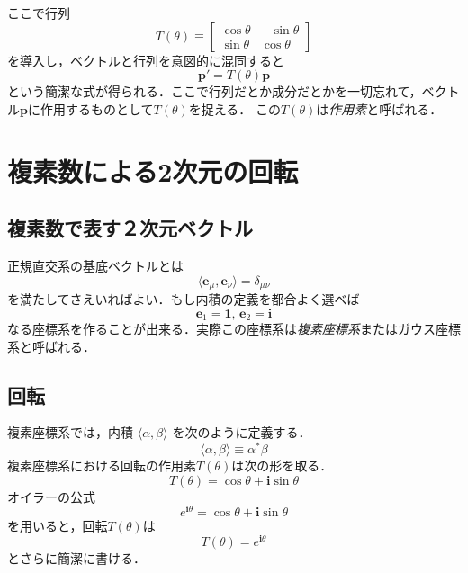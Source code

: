 \documentclass{jsbook}
\newcommand{\keyword}[1]{\emph{#1}}
\newcommand{\one}{\mathbf{1}}
\newcommand{\im}{\mathbf{i}}
\newcommand{\ee}{\mathit{e}}
\newcommand{\bvec}[1]{\boldsymbol{#1}}
\begin{document}
ここで行列
\begin{equation}
T(\theta)\equiv\begin{bmatrix}\cos\theta&-\sin\theta\\\sin\theta&\cos\theta\end{bmatrix}
\end{equation}
を導入し，ベクトルと行列を意図的に混同すると
\begin{equation}
\bvec{p}'=T(\theta)\bvec{p}
\end{equation}
という簡潔な式が得られる．ここで行列だとか成分だとかを一切忘れて，ベクトル$\bvec{p}$に作用するものとして$T(\theta)$を捉える．
この$T(\theta)$は\keyword{作用素}と呼ばれる．

\section{複素数による2次元の回転}

\subsection{複素数で表す２次元ベクトル}

正規直交系の基底ベクトルとは
\begin{equation}
\langle\bvec{e}_\mu,\bvec{e}_\nu\rangle=\delta_{\mu\nu}
\end{equation}
を満たしてさえいればよい．もし内積の定義を都合よく選べば
\begin{equation}
\bvec{e}_1=\one,\,\bvec{e}_2=\im
\end{equation}
なる座標系を作ることが出来る．実際この座標系は\keyword{複素座標系}またはガウス座標系と呼ばれる．

\subsection{回転}

複素座標系では，内積 $\langle\alpha,\beta\rangle$ を次のように定義する．
\begin{equation}
\langle\alpha,\beta\rangle\equiv\alpha^*\beta
\end{equation}
複素座標系における回転の作用素$T(\theta)$は次の形を取る．
\begin{equation}
T(\theta)=\cos\theta+\im\sin\theta
\end{equation}
%
%
オイラーの公式
\begin{equation}
\ee^{\im\theta}=\cos\theta+\im\sin\theta
\end{equation}
を用いると，回転$T(\theta)$は
\begin{equation}
T(\theta)=\ee^{\im\theta}
\end{equation}
とさらに簡潔に書ける．
\end{document}
